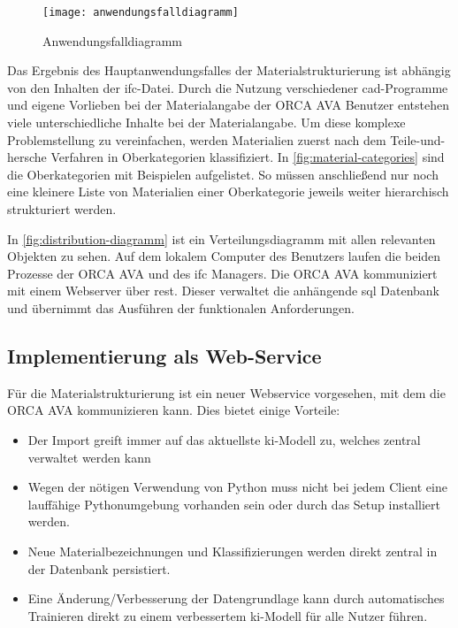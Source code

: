 \begin{figure}[h]
	\centering
	\texttt{[image: anwendungsfalldiagramm]}
	\caption[Anwendungsfalldiagramm]{Anwendungsfalldiagramm}
	\label{fig:usecasediagramm}
\end{figure}

Das Ergebnis des Hauptanwendungsfalles der Materialstrukturierung ist abhängig von den Inhalten der \ac{ifc}-Datei. Durch die Nutzung verschiedener \ac{cad}-Programme und eigene Vorlieben bei der Materialangabe der ORCA AVA Benutzer entstehen viele unterschiedliche Inhalte bei der Materialangabe. Um diese komplexe Problemstellung zu vereinfachen, werden Materialien zuerst nach dem \glqq Teile-und-hersche\grqq{} Verfahren in Oberkategorien klassifiziert. In \autoref{fig:material-categories} sind die Oberkategorien mit Beispielen aufgelistet. So müssen anschließend nur noch eine kleinere Liste von Materialien einer Oberkategorie jeweils weiter hierarchisch strukturiert werden.

In \autoref{fig:distribution-diagramm} ist ein Verteilungsdiagramm mit allen relevanten Objekten zu sehen. Auf dem lokalem Computer des Benutzers laufen die beiden Prozesse der ORCA AVA und des \ac{ifc} Managers. Die ORCA AVA kommuniziert mit einem Webserver über \ac{rest}. Dieser verwaltet die anhängende \ac{sql} Datenbank und übernimmt das Ausführen der funktionalen Anforderungen.

\subsection{Implementierung als Web-Service}
\label{c:conception:architecture:service}
Für die Materialstrukturierung ist ein neuer Webservice vorgesehen, mit dem die ORCA AVA kommunizieren kann. Dies bietet einige Vorteile:

\begin{itemize}
	\setlength\itemsep{0.3em}
	\item Der Import greift immer auf das aktuellste \ac{ki}-Modell zu, welches zentral verwaltet werden kann
	\item Wegen der nötigen Verwendung von Python muss nicht bei jedem Client eine lauffähige Pythonumgebung vorhanden sein oder durch das Setup installiert werden.
	\item Neue Materialbezeichnungen und Klassifizierungen werden direkt zentral in der Datenbank persistiert.
	\item Eine Änderung/Verbesserung der Datengrundlage kann durch automatisches Trainieren direkt zu einem verbessertem \ac{ki}-Modell für alle Nutzer führen.
\end{itemize}

